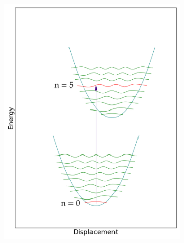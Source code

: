 \documentclass[12pt, fleqn]{beamer}
\begin{document}
\begin{frame}
\begin{overlayarea}{\textwidth}{14cm}
{\begin{figure}[h!]
\begin{subfigure}[b]{0.45\linewidth}
                    \includegraphics[width=\linewidth]{fc/tr_5.png}
                \end{subfigure}
                \begin{subfigure}[b]{0.45\linewidth}

\end{subfigure}
\end{figure}}
\end{overlayarea}
\end{frame}
\end{document}
